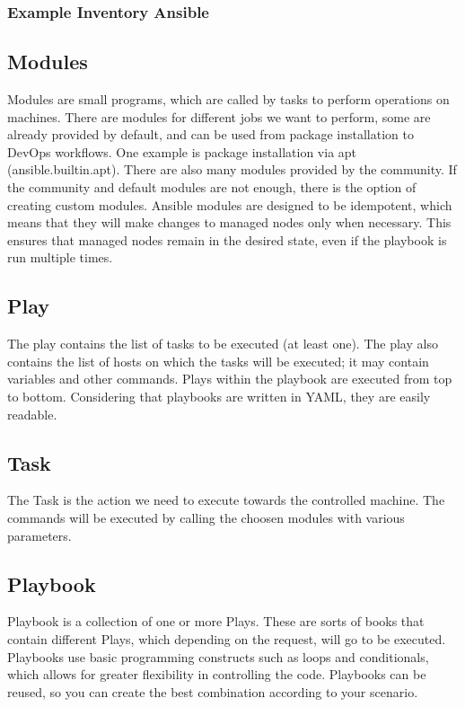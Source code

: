 \documentclass[12pt,a4paper,openright,twoside]{book}
\begin{document}
\subsubsection{Example Inventory Ansible}



\subsection{Modules}
Modules are small programs, which are called by tasks to perform operations on machines.
There are modules for different jobs we want to perform, some are already provided by default, and can be used from package installation to DevOps workflows.
One example is package installation via apt (ansible.builtin.apt).
There are also many modules provided by the community. If the community and default modules are not enough, there is the option of creating custom modules\cite{ansibleDocNewModules}.
Ansible modules are designed to be idempotent, which means that they will make changes to managed nodes only when necessary. This ensures that managed nodes remain in the desired state, even if the playbook is run multiple times.

\subsection{Play}
The play contains the list of tasks to be executed (at least one). The play also contains the list of hosts on which the tasks will be executed; it may contain variables and other commands.
Plays within the playbook are executed from top to bottom. Considering that playbooks are written in YAML, they are easily readable.

\subsection{Task}
The Task is the action we need to execute towards the controlled machine. The commands will be executed by calling the choosen modules with various parameters.

\subsection{Playbook}
Playbook is a collection of one or more Plays.
These are sorts of books that contain different Plays, which depending on the request, will go to be executed. Playbooks use basic programming constructs such as loops and conditionals, which allows for greater flexibility in controlling the code.
Playbooks can be reused, so you can create the best combination according to your scenario.
\end{document}

